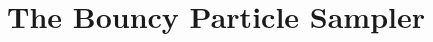 \documentclass[report.tex]{subfiles}
\begin{document}
\chapter{The Bouncy Particle Sampler}
\label{chapter-bouncy-particle-sampler}
\end{document}
